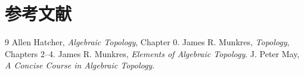 \documentclass[12pt,a4paper,UTF8]{ctexart}
\theoremstyle{definition}
\begin{document}
\section*{参考文献}

\begin{thebibliography}{9}
 Allen Hatcher, \emph{Algebraic Topology}, Chapter 0.
 James R. Munkres, \emph{Topology}, Chapters 2--4.
 James R. Munkres, \emph{Elements of Algebraic Topology}.
 J. Peter May, \emph{A Concise Course in Algebraic Topology}.
\end{thebibliography}
\end{document}
